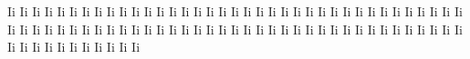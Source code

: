 \documentclass{worksheet}
\begin{document}
\begin{drillsheet}
\calligra
Ii Ii Ii Ii Ii Ii Ii Ii Ii Ii Ii Ii Ii Ii Ii Ii Ii Ii Ii Ii Ii Ii Ii Ii Ii Ii Ii Ii Ii Ii Ii Ii Ii Ii Ii Ii Ii Ii Ii Ii Ii Ii Ii Ii Ii Ii Ii Ii Ii Ii Ii Ii Ii Ii Ii Ii Ii Ii Ii Ii Ii Ii Ii Ii Ii Ii Ii Ii Ii Ii Ii Ii Ii Ii Ii Ii Ii Ii Ii Ii Ii Ii Ii Ii Ii
\end{drillsheet}
\end{document}
